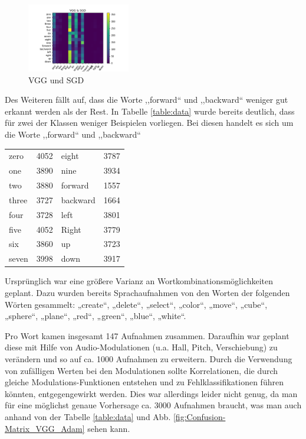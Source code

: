 \documentclass[sigconf]{acmart}
\begin{document}
\begin{figure}[H]
  \includegraphics[width=0.4\textwidth]{images/Confusion-Matrix_VGG_SGD}
  \caption{VGG und SGD}
  \Description{}
  \label{fig:Confusion-Matrix_VGG_SGD}
\end{figure} 

Des Weiteren fällt auf, dass die Worte ,,forward“ und ,,backward“ weniger gut erkannt werden als der Rest. In Tabelle \ref{table:data} wurde bereits deutlich, dass für zwei der Klassen weniger Beispielen vorliegen. Bei diesen handelt es sich um die Worte ,,forward“ und ,,backward“ 

\begin{center}
\label{table:data}
\begin{tabular}{llll}
zero & 4052 & eight & 3787  \\
one & 3890 & nine & 3934  \\
two & 3880 & forward & 1557  \\
three &  3727 & backward & 1664 \\
four & 3728 & left & 3801 \\
five & 4052 & Right & 3779\\
six & 3860 & up & 3723\\
seven & 3998 & down & 3917 
\end{tabular}
\end{center}

Ursprünglich war eine größere Varianz an Wortkombinationsmöglichkeiten geplant. Dazu wurden bereits Sprachaufnahmen von den Worten der folgenden Wörten gesammelt: „create“, „delete“, „select“, „color“, „move“, „cube“, „sphere“, „plane“, „red“, „green“, „blue“, „white“. 

Pro Wort kamen insgesamt 147 Aufnahmen zusammen. Daraufhin war geplant diese mit Hilfe von Audio-Modulationen (u.a. Hall, Pitch, Verschiebung) zu verändern und so auf ca. 1000 Aufnahmen zu erweitern. Durch die Verwendung von zufälligen Werten bei den Modulationen sollte Korrelationen, die durch gleiche Modulations-Funktionen entstehen und zu Fehlklassifikationen führen könnten, entgegengewirkt werden.  
Dies war allerdings leider nicht genug, da man für eine möglichst genaue Vorhersage ca. 3000 Aufnahmen braucht, was man auch anhand von der Tabelle \ref{table:data} und Abb. \ref{fig:Confusion-Matrix_VGG_Adam} sehen kann.
\end{document}
